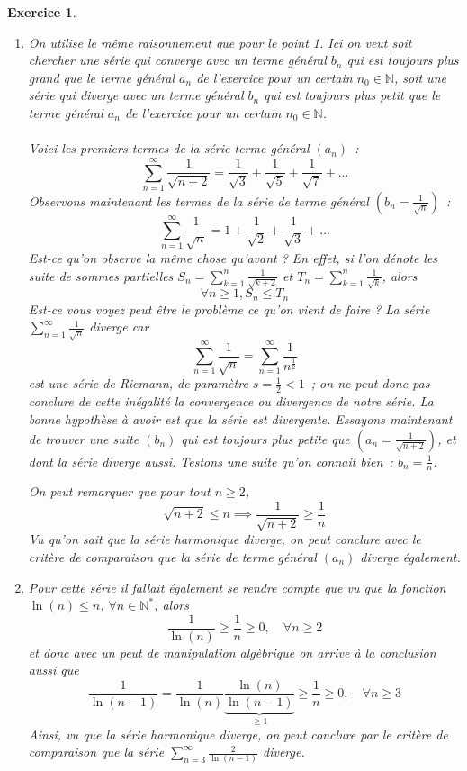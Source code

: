 \documentclass[11.5pt,french,table]{article}
\theoremstyle{exercice}
\newtheorem{exercice}{Exercice}
\begin{document}
\begin{exercice}
\begin{enumerate}
    \item On utilise le même raisonnement que pour le point 1. Ici on veut soit chercher une série qui converge avec un terme général $b_n$ qui est toujours plus grand que le terme général $a_n$ de l'exercice pour un certain $n_0 \in \mathbb{N}$, soit une série qui diverge avec un terme général $b_n$ qui est toujours plus petit que le terme général $a_n$ de l'exercice pour un certain $n_0 \in \mathbb{N}$.
    \\
    \\
    Voici les premiers termes de la série terme général $(a_n)$~:
    \[
    \sum_{n = 1}^{\infty} \frac{1}{\sqrt{n + 2}} = \frac{1}{\sqrt{3}} + \frac{1}{\sqrt{5}} + \frac{1}{\sqrt{7}} + ... 
    \]
    Observons maintenant les termes de la série de terme général $(b_n = \frac{1}{\sqrt{n}})$~:
    \[
    \sum_{n = 1}^{\infty} \frac{1}{\sqrt{n}} = 1 + \frac{1}{\sqrt{2}} + \frac{1}{\sqrt{3}} + ... 
    \]
    Est-ce qu'on observe la même chose qu'avant ? En effet, si l'on dénote les suite de sommes partielles $S_n = \sum_{k=1}^n \frac{1}{\sqrt{k + 2}}$ et $T_n = \sum_{k=1}^n \frac{1}{\sqrt{k}}$, alors
    \[
    \forall n \geq 1, S_n \leq T_n 
    \]
    Est-ce vous voyez peut être le problème ce qu'on vient de faire ? La série $\displaystyle\sum_{n=1}^\infty \frac{1}{\sqrt{n}}$ diverge car
    \[
    \sum_{n = 1}^{\infty} \frac{1}{\sqrt{n}} = \sum_{n = 1}^{\infty} \frac{1}{n^{\frac{1}{2}}}
    \]
    est une série de Riemann, de paramètre $s = \frac{1}{2} < 1$~; on ne peut donc pas conclure de cette inégalité la convergence ou divergence de notre série. La bonne hypothèse à avoir est que la série est divergente. Essayons maintenant de trouver une suite $(b_n)$ qui est toujours plus petite que $(a_n = \frac{1}{\sqrt{n + 2}})$, et dont la série diverge aussi. Testons une suite qu'on connait bien~: $b_n = \frac{1}{n}$.
    
    On peut remarquer que pour tout $n \geq 2$,
    \[
    \sqrt{n + 2} \leq n \implies \frac{1}{\sqrt{n + 2}} \geq \frac{1}{n}
    \]
    Vu qu'on sait que la série harmonique diverge, on peut conclure avec le critère de comparaison que la série de terme général $(a_n)$ diverge également.
    
    \item Pour cette série il fallait également se rendre compte que vu que la fonction $\ln(n) \leq n$, $\forall n \in \mathbb{N}^{*} $, alors
    \[
    \frac{1}{\ln(n)} \geq \frac{1}{n} \geq 0, \quad \forall n \geq 2
    \]
    et donc avec un peut de manipulation algèbrique on arrive à la conclusion aussi que
    \[
    \frac{1}{\ln(n - 1)} = \frac{1}{\ln(n)} \underbrace{\frac{\ln(n)}{\ln(n-1)}}_{\geq 1} \geq \frac{1}{n} \geq 0, \quad \forall n \geq 3
    \]
    Ainsi, vu que la série harmonique diverge, on peut conclure par le critère de comparaison que la série $\displaystyle\sum_{n=3}^\infty \frac{2}{\ln(n - 1)}$ diverge.
    \end{enumerate}

\end{exercice}
\end{document}
